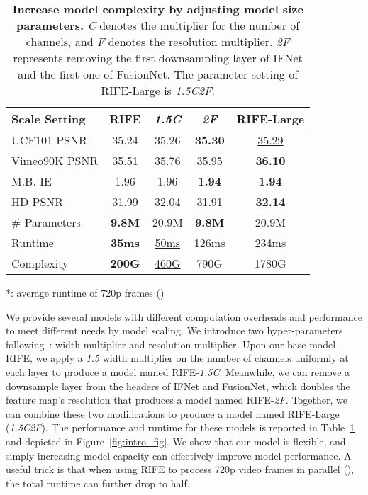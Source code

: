 \documentclass[10pt,twocolumn,letterpaper]{article}
\def\red#1{\textcolor{MyRed}{#1}}
\def\blue#1{\textcolor{MyBlue}{#1}}
\def\first#1{\red{\textbf{#1}}}
\def\second#1{\blue{\underline{#1}}}
\begin{document}
\begin{table}[t]
	\caption{\textbf{Increase model complexity by adjusting model size parameters.} \textit{C} denotes the multiplier for the number of channels, and \textit{F} denotes the resolution multiplier. \textit{2F} represents removing the first downsampling layer of IFNet and the first one of FusionNet. The parameter setting of RIFE-Large is \textit{1.5C2F}. }\label{tab:large}
	\centering
	\small
	\begin{tabular}{lcccc}
		\hline
		Scale Setting  & RIFE & \textit{1.5C} & \textit{2F} & RIFE-Large \\ \hline
		UCF101 PSNR & 35.24 & 35.26 & \first{35.30} & \second{35.29} \\
		Vimeo90K PSNR& 35.51 & 35.76 & \second{35.95} & \first{36.10}\\ M.B. IE & 1.96 & 1.96 & \first{1.94} & \first{1.94}
		\\
		HD PSNR& 31.99 & \second{32.04} & 31.91 & \first{32.14} \\ 

		\# Parameters & \first{9.8M} & 20.9M & \first{9.8M} & 20.9M\\ Runtime & \first{35ms} & \second{50ms} & 126ms & 234ms\\
		
		Complexity & \first{200G} & \second{460G} & 790G & 1780G\\
		\hline
	\end{tabular}
	\normalsize
	\begin{tablenotes}
		\raggedleft
		\item{
			*: average runtime of 720p frames ()
		}
	\end{tablenotes}
	\vspace{-1em}
\end{table}

We provide several models with different computation overheads and performance to meet different needs by model scaling. We introduce two hyper-parameters following~\cite{howard2017mobilenets}: width multiplier and resolution multiplier. Upon our base model RIFE, we apply a \textit{1.5} width multiplier on the number of channels uniformly at each layer to produce a model named RIFE-\textit{1.5C}. Meanwhile, we can remove a downsample layer from the headers of IFNet and FusionNet, which doubles the feature map's resolution that produces a model named RIFE-\textit{2F}. Together, we can combine these two modifications to produce a model named RIFE-Large (\textit{1.5C2F}). The performance and runtime for these models is reported in Table~\ref{tab:large} and depicted in Figure~\ref{fig:intro_fig}. We show that our model is flexible, and simply increasing model capacity can effectively improve model performance. A useful trick is that when using RIFE to process 720p video frames in parallel (), the total runtime can further drop to half.
\end{document}
